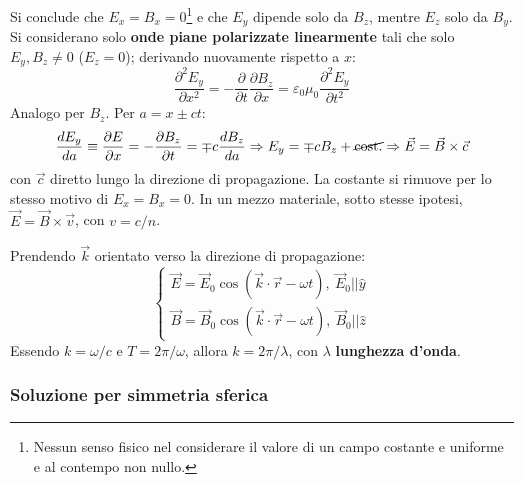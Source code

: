 \documentclass[10pt, a4paper]{scrartcl}
\numberwithin{equation}{subsection}
\theoremstyle{style1}
\begin{document}
Si conclude che $E_x=B_x = 0$\footnote{Nessun senso fisico nel considerare il valore di un campo costante e uniforme e al contempo non nullo.} e che $E_y$ dipende solo da $B_z$, mentre $E_z$ solo da $B_y$. Si considerano solo \textbf{onde piane polarizzate linearmente} tali che solo $E_y,B_z \neq 0$ ($E_z = 0$); derivando nuovamente rispetto a $x$:
\begin{equation}
	\frac{\partial ^2 E_y}{\partial x^2} = - \frac{\partial }{\partial t} \frac{\partial B_z}{\partial x} = \varepsilon _0 \mu _0 \frac{\partial ^2 E_y}{\partial t^2} 
\end{equation}
Analogo per $B_z$. Per $a=x\pm ct$:
\[
	\frac{d E_y}{d a} \equiv \frac{\partial E}{\partial x} = - \frac{\partial B_z}{\partial t} = \mp c \frac{d B_z}{d a} \Rightarrow E_y = \mp c B_z + \cancel{\text{cost.}}\Rightarrow \vec{E}=\vec{B}\times \vec{c}
\] 
con $\vec{c}$ diretto lungo la direzione di propagazione. La costante si rimuove per lo stesso motivo di $E_x=B_x=0$. In un mezzo materiale, sotto stesse ipotesi, $\vec{E}=\vec{B}\times \vec{v}$, con $v= c / n$.

Prendendo $\vec{k}$ orientato verso la direzione di propagazione:
\[
\begin{cases}
	\vec{E}=\vec{E}_0 \cos(\vec{k}\cdot \vec{r}-\omega t), \ \vec{E}_0 | | \hat{y}\\
	\vec{B}=\vec{B}_0 \cos(\vec{k}\cdot \vec{r}-\omega t), \ \vec{B}_0 | | \hat{z}
\end{cases}
\] 
Essendo $k=\omega / c$ e $T = 2\pi / \omega$, allora $k = 2\pi / \lambda $, con $\lambda $ \textbf{lunghezza d'onda}.
\subsubsection{Soluzione per simmetria sferica}
\end{document}
